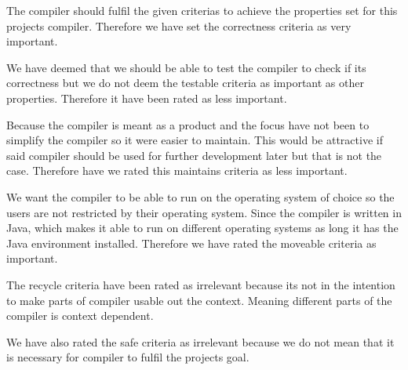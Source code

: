 The compiler should fulfil the given criterias to achieve the properties set for this projects compiler. Therefore we have set the correctness criteria as very important.

We have deemed that we should be able to test the compiler to check if its correctness but we do not deem the testable criteria as important as other properties. Therefore it have been rated as less important.

Because the compiler is meant as a product and the focus have not been to simplify the compiler so it were easier to maintain. This would be attractive if said compiler should be used for further development later but that is not the case. Therefore have we rated this maintains criteria as less important.

We want the compiler to be able to run on the operating system of choice so the users are not restricted by their operating system. Since the compiler is written in Java, which makes it able to run on different operating systems as long it has the Java environment installed. Therefore we have rated the moveable criteria as important.

The recycle criteria have been rated as irrelevant because its not in the intention to make parts of compiler usable out the context. Meaning different parts of the compiler is context dependent.

We have also rated the safe criteria as irrelevant because we do not mean that it is necessary for compiler to fulfil the projects goal.